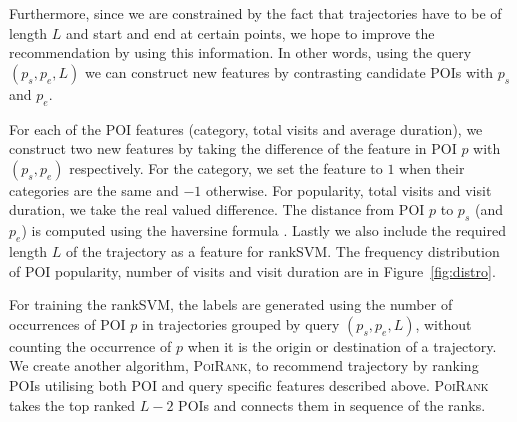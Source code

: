 Furthermore, since we are constrained by the fact that trajectories have to be of length $L$ and start and end at certain points, we hope to improve the recommendation by using this information.
In other words, using the query $(p_s, p_e, L)$ we can construct new features by contrasting
candidate POIs with $p_s$ and $p_e$.

For each of the POI features (category, total visits and average duration),
we construct two new features by taking the difference of
the feature in POI $p$ with $(p_s, p_e)$ respectively.
For the category, we set the feature to $1$ when their categories are the same and $-1$ otherwise.
For popularity, total visits and visit duration, we take the real valued difference.
The distance from POI $p$ to $p_s$ (and $p_e$) is computed using the haversine formula \cite{haversine}.
Lastly we also include the required length $L$ of the trajectory as a feature for rankSVM.
The frequency distribution of POI popularity, number of visits and visit duration are in Figure~\ref{fig:distro}.

For training the rankSVM, the labels are generated using the number of occurrences of
POI $p$ in trajectories grouped by query $(p_s, p_e, L)$,
without counting the occurrence of $p$ when it is the origin or destination of a trajectory.
We create another algorithm, \textsc{PoiRank}, to recommend trajectory by ranking POIs 
utilising both POI and query specific features described above. \textsc{PoiRank} takes the top ranked $L-2$ POIs
and connects them in sequence of the ranks.



